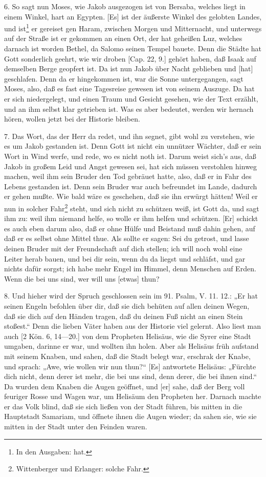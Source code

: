 6. So sagt nun Moses, wie Jakob ausgezogen ist von Bersaba, welches liegt in einem Winkel, hart an Egypten. [Es] ist der äußerste Winkel des gelobten Landes, und ist\footnote{In den Ausgaben: hat.} er gereiset gen Haram, zwischen Morgen und Mitternacht, und unterwegs auf der Straße ist er gekommen an einen Ort, der hat geheißen Luz, welches darnach ist worden Bethel, da Salomo seinen Tempel bauete. Denn die Städte hat Gott sonderlich geehrt, wie wir droben [Cap. 22, 9.] gehört haben, daß Isaak auf demselben Berge geopfert ist. Da ist nun Jakob über Nacht geblieben und [hat] geschlafen. Denn da er hingekommen ist, war die Sonne untergegangen, sagt Moses, also, daß es fast eine Tagesreise gewesen ist von seinem Auszuge. Da hat er sich niedergelegt, und einen Traum und Gesicht gesehen, wie der Text erzählt, und an ihm selbst klar getrieben ist. Was es aber bedeutet, werden wir hernach hören, wollen jetzt bei der Historie bleiben.

7. Das Wort, das der Herr da redet, und ihn segnet, gibt wohl zu verstehen, wie es um Jakob gestanden ist. Denn Gott ist nicht ein unnützer Wächter, daß er sein Wort in Wind werfe, und rede, wo es nicht noth ist. Darum weist sich's aus, daß Jakob in großem Leid und Angst gewesen sei, hat sich müssen verstohlen hinweg machen, weil ihm sein Bruder den Tod gebräuet hatte, also, daß er in Fahr des Lebens gestanden ist. Denn sein Bruder war auch befreundet im Lande, dadurch er gehen mußte. Wie bald wäre es geschehen, daß sie ihn erwürgt hätten! Weil er nun in solcher Fahr\footnote{Wittenberger und Erlanger: solche Fahr.} steht, und sich nicht zu schützen weiß, ist Gott da, und sagt ihm zu: weil ihm niemand helfe, so wolle er ihm helfen und schützen. [Er] schickt es auch eben darum also, daß er ohne Hülfe und Beistand muß dahin gehen, auf daß er es selbst ohne Mittel thue. Als sollte er sagen: Sei du getrost, und lasse deinen Bruder mit der Freundschaft auf dich stellen; ich will noch wohl eine Leiter herab bauen, und bei dir sein, wenn du da liegst und schläfst, und gar nichts dafür sorgst; ich habe mehr Engel im Himmel, denn Menschen auf Erden. Wenn die bei uns sind, wer will uns [etwas] thun?

8. Und hieher wird der Spruch geschlossen sein im 91. Psalm, V. 11. 12.: „Er hat seinen Engeln befohlen über dir, daß sie dich behüten auf allen deinen Wegen, daß sie dich auf den Händen tragen, daß du deinen Fuß nicht an einen Stein stoßest.“ Denn die lieben Väter haben aus der Historie viel gelernt. Also liest man auch [2 Kön. 6, 14—20.] von dem Propheten Helisäus, wie die Syrer eine Stadt umgaben, darinne er war, und wollten ihn holen. Aber als Helisäus früh aufstand mit seinem Knaben, und sahen, daß die Stadt belegt war, erschrak der Knabe, und sprach: „Awe, wie wollen wir nun thun?“ [Es] antwortete Helisäus: „Fürchte dich nicht, denn derer ist mehr, die bei uns sind, denn derer, die bei ihnen sind.“ Da wurden dem Knaben die Augen geöffnet, und [er] sahe, daß der Berg voll feuriger Rosse und Wagen war, um Helisäum den Propheten her. Darnach machte er das Volk blind, daß sie sich ließen von der Stadt führen, bis mitten in die Hauptstadt Samariam, und öffnete ihnen die Augen wieder; da sahen sie, wie sie mitten in der Stadt unter den Feinden waren.

